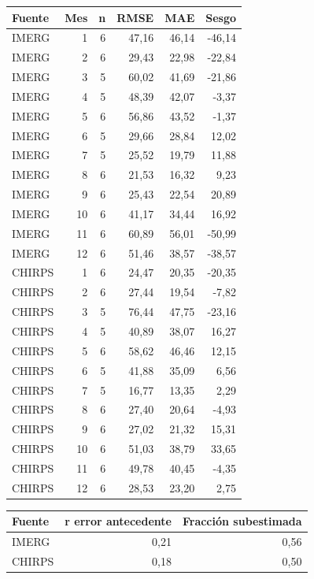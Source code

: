 \begin{center}\small\begin{tabular}{lrrrrr}\hline
Fuente & Mes & n & RMSE & MAE & Sesgo \\ \hline
IMERG & 1 & 6 & 47,16 & 46,14 & -46,14 \\
IMERG & 2 & 6 & 29,43 & 22,98 & -22,84 \\
IMERG & 3 & 5 & 60,02 & 41,69 & -21,86 \\
IMERG & 4 & 5 & 48,39 & 42,07 & -3,37 \\
IMERG & 5 & 6 & 56,86 & 43,52 & -1,37 \\
IMERG & 6 & 5 & 29,66 & 28,84 & 12,02 \\
IMERG & 7 & 5 & 25,52 & 19,79 & 11,88 \\
IMERG & 8 & 6 & 21,53 & 16,32 & 9,23 \\
IMERG & 9 & 6 & 25,43 & 22,54 & 20,89 \\
IMERG & 10 & 6 & 41,17 & 34,44 & 16,92 \\
IMERG & 11 & 6 & 60,89 & 56,01 & -50,99 \\
IMERG & 12 & 6 & 51,46 & 38,57 & -38,57 \\
CHIRPS & 1 & 6 & 24,47 & 20,35 & -20,35 \\
CHIRPS & 2 & 6 & 27,44 & 19,54 & -7,82 \\
CHIRPS & 3 & 5 & 76,44 & 47,75 & -23,16 \\
CHIRPS & 4 & 5 & 40,89 & 38,07 & 16,27 \\
CHIRPS & 5 & 6 & 58,62 & 46,46 & 12,15 \\
CHIRPS & 6 & 5 & 41,88 & 35,09 & 6,56 \\
CHIRPS & 7 & 5 & 16,77 & 13,35 & 2,29 \\
CHIRPS & 8 & 6 & 27,40 & 20,64 & -4,93 \\
CHIRPS & 9 & 6 & 27,02 & 21,32 & 15,31 \\
CHIRPS & 10 & 6 & 51,03 & 38,79 & 33,65 \\
CHIRPS & 11 & 6 & 49,78 & 40,45 & -4,35 \\
CHIRPS & 12 & 6 & 28,53 & 23,20 & 2,75 \\
\hline\end{tabular}\end{center}
\begin{center}\small\begin{tabular}{lrr}\hline
Fuente & r error antecedente & Fracción subestimada \\ \hline
IMERG & 0,21 & 0,56 \\
CHIRPS & 0,18 & 0,50 \\
\hline\end{tabular}\end{center}
